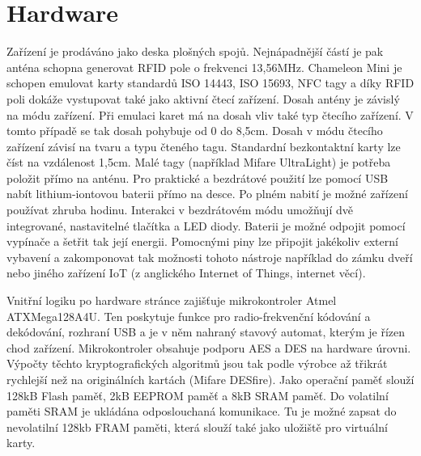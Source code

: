 \section{Hardware}
Zařízení je prodáváno jako deska plošných spojů. Nejnápadnější částí je pak anténa schopna generovat RFID pole o frekvenci 13,56MHz. Chameleon Mini je schopen emulovat karty standardů ISO 14443, ISO 15693, NFC tagy a díky RFID poli dokáže vystupovat také jako aktivní čtecí zařízení.\cite{ChameleonKickStarter} Dosah antény je závislý na módu zařízení. Při emulaci karet má na dosah vliv také typ čtecího zařízení. V tomto případě se tak dosah pohybuje od 0 do 8,5cm. Dosah v módu čtecího zařízení závisí na tvaru a typu čteného tagu. Standardní bezkontaktní karty lze číst na vzdálenost 1,5cm. Malé tagy (například Mifare UltraLight) je potřeba položit přímo na anténu.\cite{ChameleonEshop} Pro praktické a bezdrátové použití lze pomocí USB nabít {lithium-iontovou} baterii přímo na desce. Po plném nabití je možné zařízení používat zhruba hodinu. Interakci v bezdrátovém módu umožňují dvě integrované, nastavitelné tlačítka a LED diody. Baterii je možné odpojit pomocí vypínače a šetřit tak její energii. Pomocnými piny lze připojit jakékoliv externí vybavení a zakomponovat tak možnosti tohoto nástroje například do zámku dveří nebo jiného zařízení IoT (z anglického Internet of Things, internet věcí).\cite{ChameleonKickStarter}
\par
Vnitřní logiku po hardware stránce zajišťuje mikrokontroler Atmel ATXMega128A4U. Ten poskytuje funkce pro {radio-frekvenční} kódování a dekódování, rozhraní USB a je v něm nahraný stavový automat, kterým je řízen chod zařízení. Mikrokontroler obsahuje podporu AES a DES na hardware úrovni. Výpočty těchto kryptografických algoritmů jsou tak podle výrobce až třikrát rychlejší než na originálních kartách (Mifare DESfire). Jako operační paměť slouží 128kB Flash paměť, 2kB EEPROM paměť a 8kB SRAM paměť. Do volatilní paměti SRAM je ukládána odposlouchaná komunikace. Tu je možné zapsat do nevolatilní 128kb FRAM paměti, která slouží také jako uložiště pro virtuální karty.\cite{ChameleonKickStarter}

